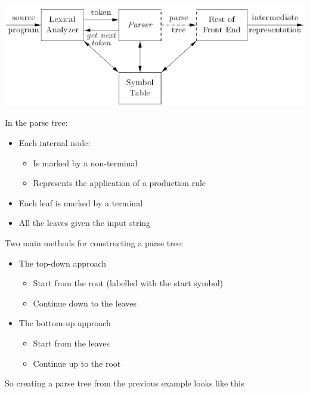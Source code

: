 \documentclass{article}[18pt]
\begin{document}
\begin{center}
	\includegraphics[scale=0.7]{process}
\end{center}
In the parse tree:
\begin{itemize}
	\item Each internal node:
	\begin{itemize}
		\item Is marked by a non-terminal
		\item Represents the application of a production rule
	\end{itemize}
	\item Each leaf is marked by a terminal
	\item All the leaves given the input string
\end{itemize}
Two main methods for constructing a parse tree:
\begin{itemize}
	\item The top-down approach
	\begin{itemize}
		\item Start from the root (labelled with the start symbol)
		\item Continue down to the leaves
	\end{itemize}
	\item The bottom-up approach
	\begin{itemize}
		\item Start from the leaves
		\item Continue up to the root
	\end{itemize}
\end{itemize}
So creating a parse tree from the previous example looks like this
\end{document}
